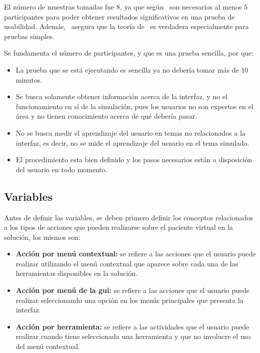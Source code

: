 El número de muestras tomadas fue 8, ya que según~\cite{nielsen2000} son
necesarios al menos $5$ participantes para poder obtener resultados
significativos en una prueba de usabilidad. Además,~\cite{ritch2009} asegura que
la teoría de~\cite{nielsen2000} es verdadera especialmente para pruebas simples. 

Se fundamenta el número de participantes, y que es una prueba sencilla, por que:

\begin{itemize}

\item La prueba que se está ejecutando es sencilla ya no debería tomar más de $10$
    minutos.

\item Se busca solamente obtener información acerca de la interfaz, y no el
    funcionamiento en sí de la simulación, pues los usuarios no son expertos en
    el área y no tienen conocimiento acerca de qué debería pasar. 

\item No se busca medir el aprendizaje del usuario en temas no relacionados a la
    interfaz, es decir, no se mide el aprendizaje del usuario en el tema
    simulado.

\item El procedimiento esta bien definido y los pasos necesarios están a
    disposición del usuario en todo momento.

\end{itemize}

\subsection{Variables}
\label{sec:evaluacion_interfaz_variables}

Antes de definir las variables, se deben primero definir los conceptos 
relacionados a los tipos de acciones que pueden realizarse sobre el paciente 
virtual en la solución, los mismos son:

\begin{itemize}
\item \textbf{Acción por menú contextual:} se refiere a las acciones que el usuario 
    puede realizar utilizando el menú contextual que aparece sobre cada una de las
    herramientas disponibles en la solución.
\item \textbf{Acción por menú de la \Gls{gui}:} se refiere a las 
    acciones que el usuario puede realizar seleccionando una opción en los menús 
    principales que presenta la interfaz.
\item \textbf{Acción por herramienta:} se refiere a las actividades que el usuario 
    puede realizar cuando tiene seleccionada una herramienta y que no involucre el 
    uso del menú contextual.
\end{itemize}


